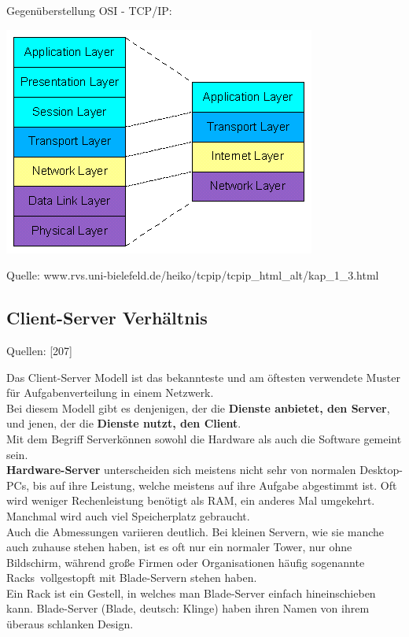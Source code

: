 \documentclass[12pt,a4paper]{report}
\begin{document}
\begin{onehalfspace}
Gegenüberstellung OSI - TCP/IP:\\
\begin{center}
\includegraphics[scale=0.7]{../docs/tarkes/pics/ositcpip.png}
\begin{scriptsize}
Quelle: www.rvs.uni-bielefeld.de/heiko/tcpip/tcpip\_html\_alt/kap\_1\_3.html
\end{scriptsize}
\end{center}
\subsection{Client-Server Verhältnis}\label{ssec:client-server}
\begin{flushright}
\begin{tiny}
Quellen: [207]
\end{tiny}
\end{flushright}
Das Client-Server Modell ist das bekannteste und am öftesten verwendete Muster für Aufgabenverteilung in einem Netzwerk.\\ 
Bei diesem Modell gibt es denjenigen, der die \textbf{Dienste anbietet, den Server}, und jenen, der die \textbf{Dienste nutzt, den Client}.\\

Mit dem Begriff \glqq Server\grqq können sowohl die Hardware als auch die Software gemeint sein.\\

\textbf{Hardware-Server} unterscheiden sich meistens nicht sehr von normalen Desktop-PCs, bis auf ihre Leistung, welche meistens auf ihre Aufgabe abgestimmt ist. Oft wird weniger Rechenleistung benötigt als RAM, ein anderes Mal umgekehrt. Manchmal wird auch viel Speicherplatz gebraucht.\\
Auch die Abmessungen variieren deutlich. Bei kleinen Servern, wie sie manche auch zuhause stehen haben, ist es oft nur ein normaler Tower, nur ohne Bildschirm, während große Firmen oder Organisationen häufig sogenannte \glqq Racks\grqq \ vollgestopft mit Blade-Servern stehen haben.\\
Ein Rack ist ein Gestell, in welches man Blade-Server einfach hineinschieben kann. Blade-Server (Blade, deutsch: Klinge) haben ihren Namen von ihrem überaus schlanken Design.\\


\end{onehalfspace}
\end{document}
